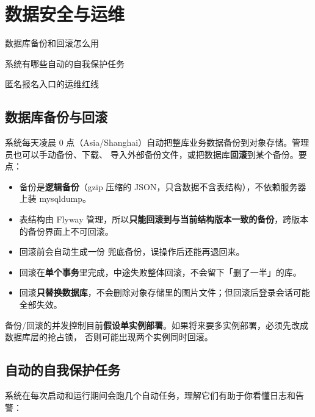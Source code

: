 \documentclass[cn,11pt,green]{elegantbook}
\begin{document}
\chapter{数据安全与运维}

\begin{introduction}
  \item 数据库备份和回滚怎么用
  \item 系统有哪些自动的自我保护任务
  \item 匿名报名入口的运维红线
\end{introduction}

\section{数据库备份与回滚}

系统每天凌晨 0 点（Asia/Shanghai）自动把整库业务数据备份到对象存储。管理员也可以手动备份、下载、
导入外部备份文件，或把数据库\textbf{回滚}到某个备份。要点：

\begin{itemize}
  \item 备份是\textbf{逻辑备份}（gzip 压缩的 JSON，只含数据不含表结构），不依赖服务器上装 mysqldump。
  \item 表结构由 Flyway 管理，所以\textbf{只能回滚到与当前结构版本一致的备份}，跨版本的备份界面上不可回滚。
  \item 回滚前会自动生成一份  兜底备份，误操作后还能再退回来。
  \item 回滚在\textbf{单个事务}里完成，中途失败整体回滚，不会留下「删了一半」的库。
  \item 回滚\textbf{只替换数据库}，不会删除对象存储里的图片文件；但回滚后登录会话可能全部失效。
\end{itemize}

\begin{warnbox}[单实例假设]
  备份/回滚的并发控制目前\textbf{假设单实例部署}。如果将来要多实例部署，必须先改成数据库层的抢占锁，
  否则可能出现两个实例同时回滚。
\end{warnbox}

\section{自动的自我保护任务}

系统在每次启动和运行期间会跑几个自动任务，理解它们有助于你看懂日志和告警：
\end{document}
